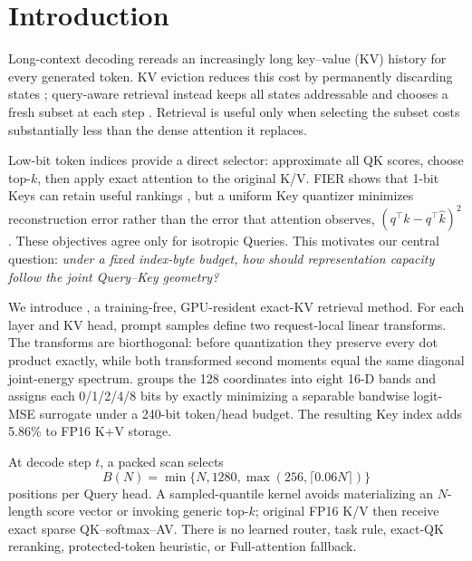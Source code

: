 \section{Introduction}
\label{sec:introduction}

Long-context decoding rereads an increasingly long key--value (KV) history
for every generated token.  KV eviction reduces this cost by permanently
discarding states \citep{zhang2023h2o,li2024snapkv,cai2024pyramidkv,
feng2024adakv}; query-aware retrieval instead keeps all states addressable and
chooses a fresh subset at each step \citep{ribar2023sparq,tang2024quest,
singhania2024loki}.  Retrieval is useful only when selecting the subset costs
substantially less than the dense attention it replaces.

Low-bit token indices provide a direct selector: approximate all QK scores,
choose top-$k$, then apply exact attention to the original K/V.  FIER shows
that 1-bit Keys can retain useful rankings \citep{wang2025fier}, but a
uniform Key quantizer minimizes reconstruction error rather than the error
that attention observes,
$(q^\top k-q^\top\widehat k)^2$.  These objectives agree only for isotropic
Queries.  This motivates our central question: \emph{under a fixed index-byte
budget, how should representation capacity follow the joint Query--Key
geometry?}

We introduce \method, a training-free, GPU-resident exact-KV retrieval
method.  For each layer and KV head, prompt samples define two request-local
linear transforms.  The transforms are biorthogonal: before quantization they
preserve every dot product exactly, while both transformed second moments
equal the same diagonal joint-energy spectrum.  \method groups the 128
coordinates into eight 16-D bands and assigns each 0/1/2/4/8 bits by exactly
minimizing a separable bandwise logit-MSE surrogate under a 240-bit
token/head budget.
The resulting Key index adds 5.86\% to FP16 K+V storage.

At decode step $t$, a packed scan selects
\begin{equation}
 B(N)=\min\{N,1280,\max(256,\lceil0.06N\rceil)\}
 \label{eq:budget-intro}
\end{equation}
positions per Query head.  A sampled-quantile kernel avoids materializing an
$N$-length score vector or invoking generic top-$k$; original FP16 K/V then
receive exact sparse QK--softmax--AV.  There is no learned router, task rule,
exact-QK reranking, protected-token heuristic, or Full-attention fallback.

